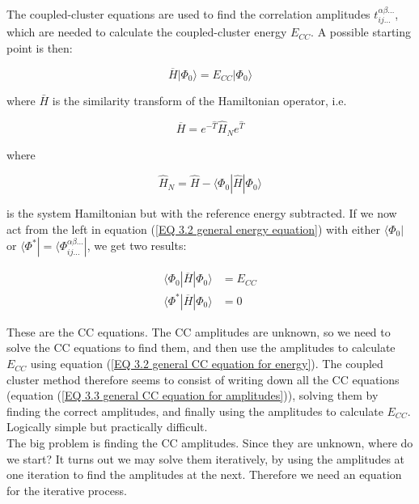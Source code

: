 \documentclass[10pt,twoside]{report}
\begin{document}
	The coupled-cluster equations are used to find the correlation amplitudes $t_{ij\ldots}^{\alpha\beta\ldots}$, which are needed to calculate the coupled-cluster energy $E_{CC}$. A possible starting point is then:
	
	\begin{equation}
		\overbar{H}|\Phi_0\rangle = E_{CC}|\Phi_0\rangle
		\label{EQ 3.2 general energy equation}
	\end{equation}
	
	\noindent where $\bar{H}$ is the similarity transform of the Hamiltonian operator, i.e.
	
	\begin{equation}
		\overbar{H} = e^{-\hat{T}}\hat{H}_Ne^{\hat{T}}
	\end{equation}
	
	
	\noindent where
	
	\begin{equation}
		\hat{H}_N = \hat{H} - \langle\Phi_0|\hat{H}|\Phi_0\rangle
	\end{equation}
	
	\noindent is the system Hamiltonian but with the reference energy subtracted. If we now act from the left in equation (\ref{EQ 3.2 general energy equation}) with either $\langle\Phi_0|$ or $\langle\Phi^*| = \langle\Phi_{ij\ldots}^{\alpha\beta\ldots}|$, we get two results:
	
	\begin{align}
	\langle\Phi_0|\overbar{H}|\Phi_0\rangle &= E_{CC}
	\label{EQ 3.2 general CC equation for energy}\\
	\langle\Phi^*|\overbar{H}|\Phi_0\rangle &= 0
	\label{EQ 3.3 general CC equation for amplitudes}
	\end{align}
	
	These are the CC equations. The CC amplitudes are unknown, so we need to solve the CC equations to find them, and then use the amplitudes to calculate $E_{CC}$ using equation (\ref{EQ 3.2 general CC equation for energy}). The coupled cluster method therefore seems to consist of writing down all the CC equations (equation (\ref{EQ 3.3 general CC equation for amplitudes})), solving them by finding the correct amplitudes, and finally using the amplitudes to calculate $E_{CC}$. Logically simple but practically difficult.\\
	
	The big problem is finding the CC amplitudes. Since they are unknown, where do we start? It turns out we may solve them iteratively, by using the amplitudes at one iteration to find the amplitudes at the next. Therefore we need an equation for the iterative process.\\
	
\end{document}
